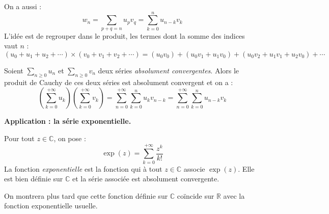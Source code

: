 \documentclass[a4paper,10pt]{report}
\newcommand{\Sum}[2]{\ensuremath{\textstyle{\sum\limits_{#1}^{#2}}}}
\begin{document}
\begin{rem} On a aussi :
$$ w_n = \sum_{p+q=n} u_p v_q =  \sum_{k=0}^n u_{n-k} v_{k}$$
L'idée est de regrouper dans le produit, les termes dont la somme des indices vaut $n$ :
$$ (u_0 + u_1 + u_2 + \cdots) \times (v_0 + v_1 + v_2 + \cdots) = (u_0 v_0) + (u_0 v_1 + u_1 v_0) + (u_0 v_2 + u _1 v_1 + u_2 v_0) + \cdots$$
\end{rem}

\medskip

\begin{thm}[admis]
Soient $\Sum{n \geq 0}{} u_n$ et $\Sum{n \geq 0}{} v_n$ deux séries \textit{absolument convergentes}. Alors le produit de Cauchy de ces deux séries est absolument convergent et on a :
$$ \left( \sum_{k=0}^{+ \infty} u_k \right)\left( \sum_{k=0}^{+ \infty} v_k \right) =  \sum_{n=0}^{+ \infty} \sum_{k=0}^n u_k v_{n-k} = \sum_{n=0}^{+ \infty} \sum_{k=0}^n u_{n-k} v_{k}$$
\end{thm}

\noindent \textbf{Application : la série exponentielle.}

\begin{defip} Pour tout $z \in \mathbb{C}$, on pose :
$$ \exp(z) = \sum_{k=0}^{+\infty} \frac{z^k}{k!} $$
La fonction \textit{exponentielle} est la fonction qui à tout $z \in \mathbb{C}$ associe $\exp(z)$. Elle est bien définie sur $\mathbb{C}$ et la série associée est absolument convergente.
\end{defip}

\begin{preuve} 

\vspace{6.5cm}
%
%
%
\end{preuve}

\begin{rem} On montrera plus tard que cette fonction définie sur $\mathbb{C}$ coïncide sur $\mathbb{R}$ avec la fonction exponentielle usuelle.
\end{rem}
\end{document}
